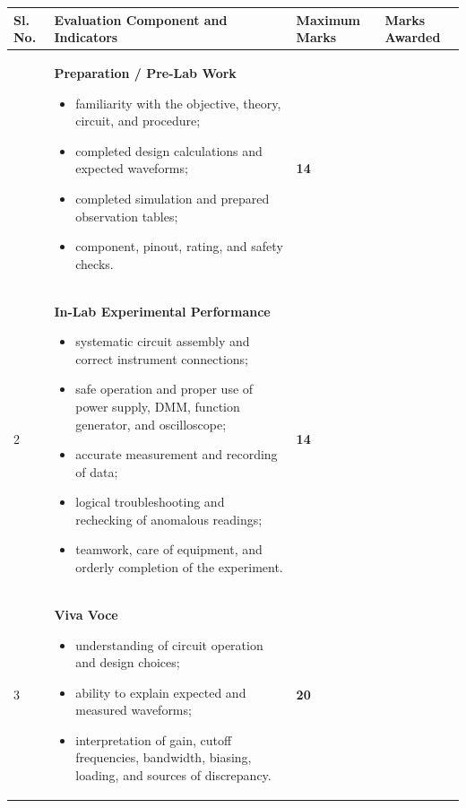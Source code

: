 \documentclass[11pt,a4paper]{article}
\begin{document}
\begin{center}
\begin{tabularx}{\textwidth}{
  |>{\centering\arraybackslash}p{9mm}
  |>{\raggedright\arraybackslash}X
  |>{\centering\arraybackslash}p{23mm}
  |>{\centering\arraybackslash}p{25mm}|
}
\hline
\textbf{Sl. No.} &
\textbf{Evaluation Component and Indicators} &
\textbf{Maximum Marks} &
\textbf{Marks Awarded} \\
\hline

1 &
\textbf{Preparation / Pre-Lab Work}
\begin{itemize}[leftmargin=4mm,nosep]
  \item familiarity with the objective, theory, circuit, and procedure;
  \item completed design calculations and expected waveforms;
  \item completed simulation and prepared observation tables;
  \item component, pinout, rating, and safety checks.
\end{itemize}
&
\textbf{14}
&
\\
\hline

2 &
\textbf{In-Lab Experimental Performance}
\begin{itemize}[leftmargin=4mm,nosep]
  \item systematic circuit assembly and correct instrument connections;
  \item safe operation and proper use of power supply, DMM, function
        generator, and oscilloscope;
  \item accurate measurement and recording of data;
  \item logical troubleshooting and rechecking of anomalous readings;
  \item teamwork, care of equipment, and orderly completion of the experiment.
\end{itemize}
&
\textbf{14}
&
\\
\hline

3 &
\textbf{Viva Voce}
\begin{itemize}[leftmargin=4mm,nosep]
  \item understanding of circuit operation and design choices;
  \item ability to explain expected and measured waveforms;
  \item interpretation of gain, cutoff frequencies, bandwidth, biasing,
        loading, and sources of discrepancy.
\end{itemize}
&
\textbf{20}
&
\\
\hline


\end{tabularx}
\end{center}
\end{document}
